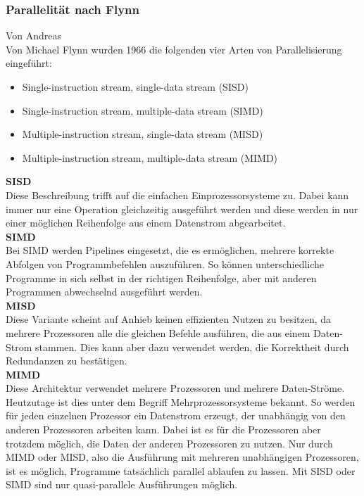 \documentclass[12pt]{article}
\begin{document}
\vspace{15pt}

\subsubsection{Parallelität nach Flynn}
Von Andreas\\

Von Michael Flynn wurden 1966 die folgenden vier Arten von Parallelisierung eingeführt: \cite{Flynn}

\begin{itemize}
\item Single-instruction stream, single-data stream (SISD)
\item Single-instruction stream, multiple-data stream (SIMD)
\item Multiple-instruction stream, single-data stream (MISD)
\item Multiple-instruction stream, multiple-data stream (MIMD)
\end{itemize}

\noindent
\textbf{SISD}\\
Diese Beschreibung trifft auf die einfachen Einprozessorsysteme zu. Dabei kann immer nur eine Operation gleichzeitig ausgeführt werden und diese werden in nur einer möglichen Reihenfolge aus einem Datenstrom abgearbeitet.\\

\noindent
\textbf{SIMD}\\
Bei SIMD werden Pipelines eingesetzt, die es ermöglichen, mehrere korrekte Abfolgen von Programmbefehlen auszuführen. So können unterschiedliche Programme in sich selbst in der richtigen Reihenfolge, aber mit anderen Programmen abwechselnd ausgeführt werden.\\

\noindent
\textbf{MISD}\\
Diese Variante scheint auf Anhieb keinen effizienten Nutzen zu besitzen, da mehrere Prozessoren alle die gleichen Befehle ausführen, die aus einem Daten-Strom stammen. Dies kann aber dazu verwendet werden, die Korrektheit durch Redundanzen zu bestätigen. \\

\noindent
\textbf{MIMD}\\
Diese Architektur verwendet mehrere Prozessoren und mehrere Daten-Ströme. Heutzutage ist dies unter dem Begriff Mehrprozessorsysteme bekannt. So werden für jeden einzelnen Prozessor ein Datenstrom erzeugt, der unabhängig von den anderen Prozessoren arbeiten kann. Dabei ist es für die Prozessoren aber trotzdem möglich, die Daten der anderen Prozessoren zu nutzen. Nur durch MIMD oder MISD, also die Ausführung mit mehreren unabhängigen Prozessoren, ist es möglich, Programme tatsächlich parallel ablaufen zu lassen. Mit SISD oder SIMD sind nur quasi-parallele Ausführungen möglich.\\
\end{document}
